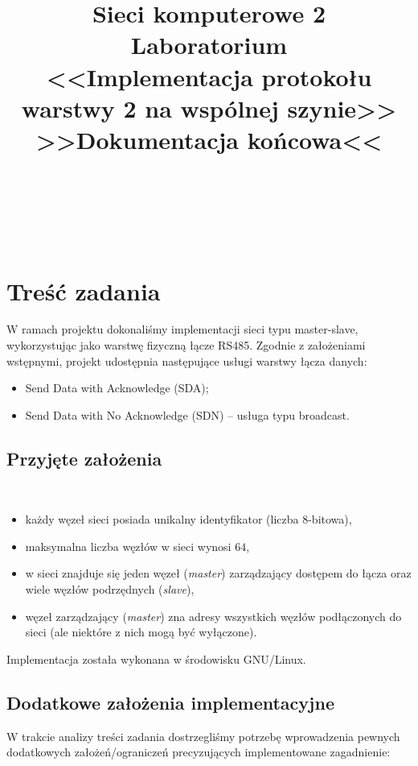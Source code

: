 \documentclass[a4paper,12pt]{article}
\title{
    \textbf{Sieci komputerowe 2 \\ Laboratorium} \\
    {\normalsize<<Implementacja protokołu warstwy 2 na wspólnej szynie>>} \\
    {\large{>>Dokumentacja końcowa<<}}
}
\author{
    \makebox[8em][c]{Piotr Bałut} \and
    \makebox[8em][c]{Maciej Rubikowski} \and
    \makebox[8em][c]{Tomasz Pieczerak}
}
\begin{document}
\maketitle\

\tableofcontents\

\section{Treść zadania}
W ramach projektu dokonaliśmy implementacji sieci typu master-slave,
wykorzystując jako warstwę fizyczną łącze RS485. Zgodnie z założeniami
wstępnymi, projekt udostępnia następujące usługi warstwy łącza danych:

\begin{itemize}
  \item Send Data with Acknowledge (SDA);
  \item Send Data with No Acknowledge (SDN) -- usługa typu broadcast.
\end{itemize}

\subsection{Przyjęte założenia}\

\begin{itemize}
  \item każdy węzeł sieci posiada unikalny identyfikator (liczba 8-bitowa),
  \item maksymalna liczba węzłów w sieci wynosi $64$,
  \item w sieci znajduje się jeden węzeł (\emph{master}) zarządzający
        dostępem do łącza oraz wiele węzłów podrzędnych (\emph{slave}),
  \item węzeł zarządzający (\emph{master}) zna adresy wszystkich węzłów
        podłączonych do sieci (ale niektóre z nich mogą być wyłączone).
\end{itemize}

Implementacja została wykonana w środowisku GNU/Linux.

\subsection{Dodatkowe założenia implementacyjne}

W trakcie analizy treści zadania dostrzegliśmy potrzebę wprowadzenia pewnych
dodatkowych założeń/ograniczeń precyzujących implementowane zagadnienie:
\end{document}
